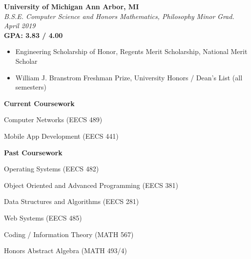 \documentclass[margin,line]{resume}
\begin{document}
\begin{resume}
	\textbf{University of Michigan \hfill Ann Arbor, MI} \\\vspace{1mm}%
	\textsl{B.S.E. Computer Science and Honors Mathematics, Philosophy Minor} \hfill \textsl{Grad. April 2019}\vspace{-1mm}\\
	\textbf{GPA: 3.83 / 4.00} \\\vspace{-2.5mm}%
	\begin{itemize}[leftmargin=4mm]
		\item Engineering Scholarship of Honor, Regents Merit Scholarship, National Merit Scholar
		\item William J. Branstrom Freshman Prize, University Honors / Dean's List (all semesters)
	\end{itemize}
	\vspace{-5mm}
	\begin{center} \textbf{Current Coursework} \end{center}
	\vspace{-3mm}
	\small
	\begin{itemize}[leftmargin=4mm]
		\begin{minipage}[t]{.6\linewidth}
			\item Computer Networks (EECS 489)
		\end{minipage}%
		\begin{minipage}[t]{.5\linewidth}
			\item Mobile App Development (EECS 441)
		\end{minipage}%
	\end{itemize}
	\normalsize
	\vspace{-8mm}
	\begin{center} \textbf{Past Coursework} \end{center}
	\vspace{-3mm}
	\small
	\begin{itemize}[leftmargin=4mm]
		\begin{minipage}[t]{.6\linewidth}
			\item Operating Systems (EECS 482)
			\item Object Oriented and Advanced Programming (EECS 381)
			\item Data Structures and Algorithms (EECS 281)
		\end{minipage}%
		\begin{minipage}[t]{.5\linewidth}
			\item Web Systems (EECS 485)
			\item Coding / Information Theory (MATH 567)
			\item Honors Abstract Algebra (MATH 493/4)
		\end{minipage}%
	\end{itemize}
	\normalsize
	\sectionbreak
	\vspace{-2.5mm}

\end{resume}
\end{document}
